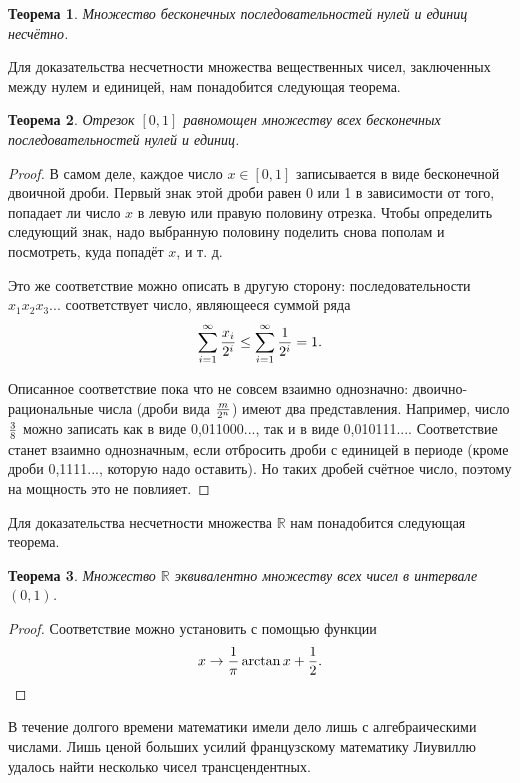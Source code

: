 \documentclass{article}
\newtheorem{theorem}{Теорема}[section]
\begin{document}
\begin{theorem}
Множество бесконечных последовательностей нулей и единиц несчётно.
\end{theorem}

Для доказательства несчетности множества вещественных чисел, заключенных между нулем и единицей, нам понадобится следующая теорема.

\begin{theorem}
Отрезок \([0, 1]\) равномощен множеству всех бесконечных последовательностей нулей и единиц.
\end{theorem}

\begin{proof}
В самом деле, каждое число \(x \in [0, 1]\) записывается в виде бесконечной двоичной дроби. Первый знак этой дроби равен 0 или 1 в зависимости от того, попадает ли число \(x\) в левую или правую половину отрезка. Чтобы определить следующий знак, надо выбранную половину поделить снова пополам и посмотреть, куда попадёт \(x\), и т. д.

Это же соответствие можно описать в другую сторону: последовательности \(x_1x_2x_3...\) соответствует число, являющееся суммой ряда
\[
\sum_{i=1}^{\infty} {x_i \over 2^i} \leq \sum_{i=1}^{\infty} {1 \over 2^i} = 1.
\]

Описанное соответствие пока что не совсем взаимно однозначно: двоично-рациональные числа (дроби вида \(m \over 2^n\)) имеют два представления. Например, число \(3 \over 8\) можно записать как в виде 0,011000..., так и в виде 0,010111.... Соответствие станет взаимно однозначным, если отбросить дроби с единицей в периоде (кроме дроби 0,1111..., которую надо оставить). Но таких дробей счётное число, поэтому на мощность это не повлияет.
\end{proof}

Для доказательства несчетности множества \(\mathbb{R}\) нам понадобится следующая теорема.

\begin{theorem}
Множество \(\mathbb{R}\) эквивалентно множеству всех чисел в интервале \((0, 1)\).
\end{theorem}

\begin{proof}
Соответствие можно установить с помощью функции
\[
x \to {1 \over \pi}\arctan{x} + {1 \over 2}.
\]
\end{proof}

В течение долгого времени математики имели дело лишь с алгебраическими числами. Лишь ценой больших усилий французскому математику Лиувиллю удалось найти несколько чисел трансцендентных.
\end{document}
